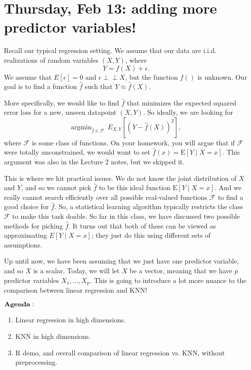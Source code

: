 \section{Thursday, Feb 13: adding more predictor variables!}

Recall our typical regression setting. We assume that our data are i.i.d. realizations of random variables $(X,Y)$, where
$$
Y = f(X) + \epsilon.
$$
We assume that $E[\epsilon]=0$ and $\epsilon \perp\!\!\!\perp X$, but the function $f()$ is unknown. Our goal is to find a function $\hat{f}$ such that $Y \approx \hat{f}(X)$. 

More specifically, we would like to find $\hat{f}$ that minimizes the expected squared error loss for a new, unseen datapoint $(X,Y)$. So ideally, we are looking for
\begin{equation}
\label{objective}
\mathrm{argmin}_{\hat{f} \in \mathcal{F}} \ \ E_{X,Y} \left[ \left(Y - \hat{f}(X)\right)^2 \right],
\end{equation}
where $\mathcal{F}$ is some class of functions. On your homework, you will argue that if $\mathcal{F}$ were totally unconstrained, we would want to set $\hat{f}(x) = \mathrm{E}[Y \mid X=x]$. This argument was also in the Lecture 2 notes, but we skipped it. 

This is where we hit practical issues. We do not know the joint distribution of $X$ and $Y$, and so we cannot pick $\hat{f}$ to be this ideal function $\mathrm{E}[Y \mid X=x]$. And we really cannot search efficiently over all possible real-valued functions $\mathcal{F}$ to find a good choice for $\hat{f}$. So, a statistical learning algorithm typically restricts the class $\mathcal{F}$ to make this task doable. So far in this class, we have discussed two possible methods for picking $\hat{f}$. It turns out that both of these can be viewed as approximating $E[Y \mid X=x]$; they just do this using different sets of assumptions. 

Up until now, we have been assuming that we just have one predictor variable, and so $X$ is a scalar. Today, we will let $X$ be a vector, meaning that we have $p$ predictor variables $X_1, \ldots, X_p$. This is going to introduce a lot more nuance to the comparison between linear regression and KNN!

$\bold{Agenda:}$
\begin{enumerate}
\item Linear regression in high dimensions.
\item KNN in high dimensions. 
\item R demo, and overall comparison of linear regression vs. KNN, without preprocessing.
\end{enumerate}

